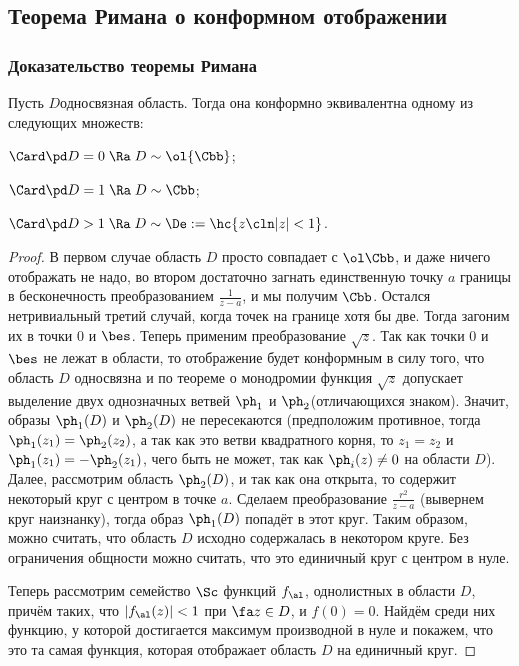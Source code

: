 \documentclass[a4paper]{article}
\begin{document}
\begin{theorem}
\subsection{Теорема Римана о конформном отображении}

\subsubsection{Доказательство теоремы Римана}

\begin{theorem}
Пусть $D$\т односвязная область. Тогда она конформно эквивалентна одному из следующих множеств:
\begin{items}{-2}
\item $\Card \pd D = 0 \; \Ra \; D \sim \ol{\Cbb}$;
\item $\Card \pd D = 1 \; \Ra \; D \sim \Cbb$;
\item $\Card \pd D > 1 \; \Ra \; D \sim \De := \hc{z\cln |z|<1}$.
\end{items}
\end{theorem}
\begin{proof}
В первом случае область $D$ просто совпадает с $\ol\Cbb$, и даже ничего отображать не надо, во втором достаточно загнать
единственную точку $a$ границы в бесконечность преобразованием $\frac{1}{z-a}$, и мы получим $\Cbb$.
Остался нетривиальный третий случай, когда точек на границе хотя бы две. Тогда загоним их в точки $0$ и $\bes$.
Теперь применим преобразование $\sqrt{z}$. Так как точки $0$ и $\bes$ не лежат в области, то отображение будет конформным
в силу того, что область $D$ односвязна и по теореме о монодромии функция $\sqrt{z}$
допускает выделение двух однозначных ветвей $\ph_1$ и $\ph_2$(отличающихся знаком). Значит, образы $\ph_1(D)$ и $\ph_2(D)$
не пересекаются (предположим противное, тогда $\ph_1(z_1)=\ph_2(z_2)$, а так как это ветви квадратного корня, то
$z_1=z_2$ и $\ph_1(z_1) = -\ph_2(z_1)$, чего быть не может, так как $\ph_i(z)\neq 0$ на области $D$).
Далее, рассмотрим область $\ph_2(D)$, и так как она открыта, то содержит некоторый круг с центром в точке $a$.
Сделаем преобразование $\frac{r^2}{z-a}$ (вывернем круг наизнанку), тогда образ $\ph_1(D)$ попадёт в этот круг.
Таким образом, можно считать, что область $D$ исходно содержалась
в некотором круге. Без ограничения общности можно считать, что это единичный круг с центром в нуле.

Теперь рассмотрим семейство $\Sc$ функций $f_\al$, однолистных в области $D$, причём  таких, что $|f_\al(z)| < 1$
при $\fa z \in D$, и $f(0)=0$. Найдём среди них функцию, у которой достигается максимум производной в нуле и покажем,
что это та самая функция, которая отображает область $D$ на единичный круг.


\end{proof}
\end{theorem}
\end{document}
